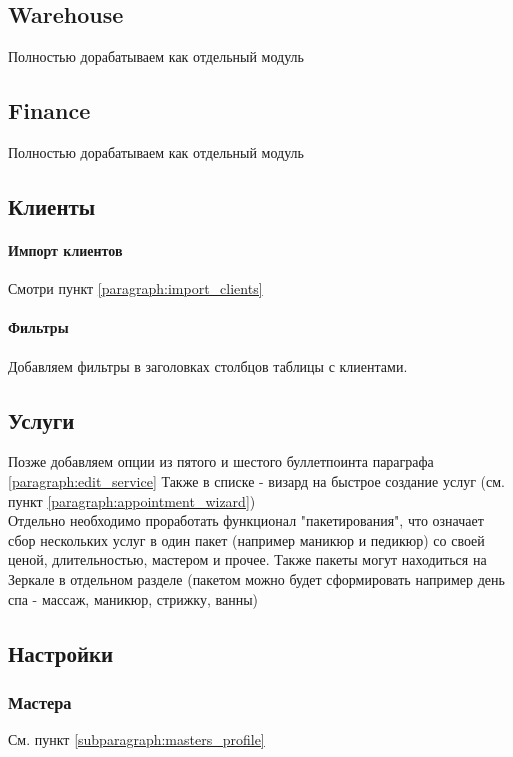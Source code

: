 \documentclass[DIV=calc, paper=a4, fontsize=11pt]{scrartcl} %
\begin{document}
\subsection{Warehouse}
Полностью дорабатываем как отдельный модуль
\subsection{Finance}
Полностью дорабатываем как отдельный модуль
\subsection{Клиенты}
\paragraph{Импорт клиентов} Смотри пункт \ref{paragraph:import_clients}
\paragraph{Фильтры} Добавляем фильтры в заголовках столбцов таблицы с клиентами.
\subsection{Услуги}
Позже добавляем опции из пятого и шестого буллетпоинта параграфа \ref{paragraph:edit_service}
Также в списке - визард на быстрое создание услуг (см. пункт \ref{paragraph:appointment_wizard})
\\[0.5cm]
Отдельно необходимо проработать функционал "пакетирования", что означает сбор нескольких услуг в один пакет (например маникюр и педикюр) со своей ценой, длительностью, мастером и прочее. Также пакеты могут находиться на Зеркале в отдельном разделе (пакетом можно будет сформировать например день спа - массаж, маникюр, стрижку, ванны)

\subsection{Настройки}
\subsubsection{Мастера}
См. пункт \ref{subparagraph:masters_profile}
\end{document}
